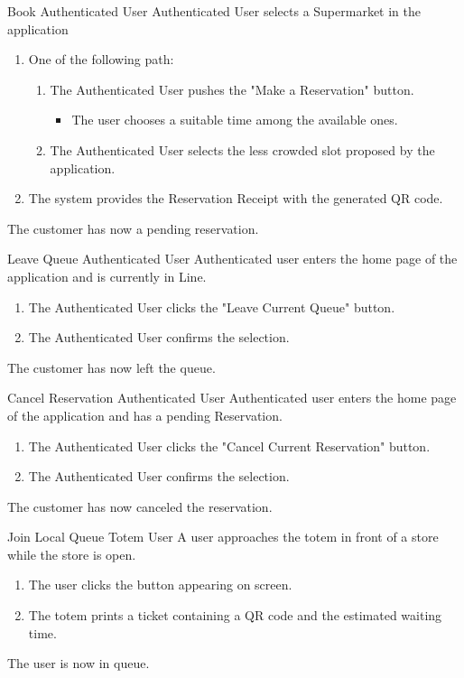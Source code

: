 \usecase
{Book}
{Authenticated User}
{Authenticated User selects a Supermarket in the application}
{
        \begin{enumerate}
            \item One of the following path:  
            \begin{enumerate}
                \item The Authenticated User pushes the "Make a Reservation" button.
                \begin{itemize}
                    \item The user chooses a suitable time among the available ones.
                \end{itemize}
                \item The Authenticated User selects the less crowded slot proposed by the application.
            \end{enumerate}
            \item The system provides the Reservation Receipt with the generated QR code.
        \end{enumerate}
}
{
    The customer has now a pending reservation.
}
{}
{}


\usecase
{Leave Queue}
{Authenticated User}
{Authenticated user enters the home page of the application and is currently in Line.}
{
    \begin{enumerate}
        \item The Authenticated User clicks the "Leave Current Queue" button.
        \item The Authenticated User confirms the selection.
    \end{enumerate}
}
{
    The customer has now left the queue.
}
{}
{}

\usecase
{Cancel Reservation}
{Authenticated User}
{Authenticated user enters the home page of the application and has a pending Reservation.}
{
    \begin{enumerate}
        \item The Authenticated User clicks the "Cancel Current Reservation" button.
        \item The Authenticated User confirms the selection.
    \end{enumerate}
}
{
    The customer has now canceled the reservation.
}
{}
{}


\usecase
{Join Local Queue}
{Totem User}
{A user approaches the totem in front of a store while the store is open.}
{
    \begin{enumerate}
        \item The user clicks the button appearing on screen.
        \item The totem prints a ticket containing a QR code and the estimated waiting time.
    \end{enumerate}
}
{
    The user is now in queue.
}
{}
{}


